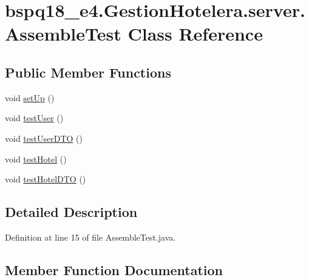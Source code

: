 \hypertarget{classbspq18__e4_1_1_gestion_hotelera_1_1server_1_1_assemble_test}{}\section{bspq18\+\_\+e4.\+Gestion\+Hotelera.\+server.\+Assemble\+Test Class Reference}
\label{classbspq18__e4_1_1_gestion_hotelera_1_1server_1_1_assemble_test}
\subsection*{Public Member Functions}
\begin{DoxyCompactItemize}
\item 
void \mbox{\hyperlink{classbspq18__e4_1_1_gestion_hotelera_1_1server_1_1_assemble_test_a5722f2691819ef9c47b375a2315d37e7}{set\+Up}} ()
\item 
void \mbox{\hyperlink{classbspq18__e4_1_1_gestion_hotelera_1_1server_1_1_assemble_test_a43895ef548780e3a979dce7a837a8b78}{test\+User}} ()
\item 
void \mbox{\hyperlink{classbspq18__e4_1_1_gestion_hotelera_1_1server_1_1_assemble_test_a4a1d994c74b7aff06ab6df1265338782}{test\+User\+D\+TO}} ()
\item 
void \mbox{\hyperlink{classbspq18__e4_1_1_gestion_hotelera_1_1server_1_1_assemble_test_af3f729a407fa8119a1bb9836308ea2ca}{test\+Hotel}} ()
\item 
void \mbox{\hyperlink{classbspq18__e4_1_1_gestion_hotelera_1_1server_1_1_assemble_test_ae98986b82eb3bf09018dd853957f4ecb}{test\+Hotel\+D\+TO}} ()
\end{DoxyCompactItemize}


\subsection{Detailed Description}


Definition at line 15 of file Assemble\+Test.\+java.



\subsection{Member Function Documentation}
\mbox{\label{classbspq18__e4_1_1_gestion_hotelera_1_1server_1_1_assemble_test_a5722f2691819ef9c47b375a2315d37e7}} 
